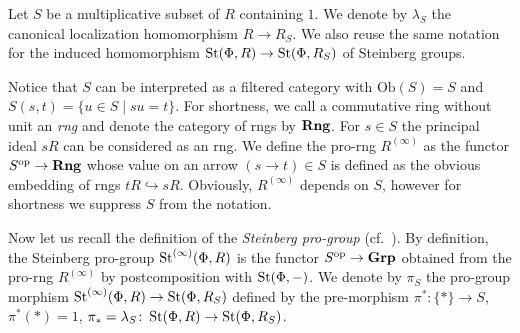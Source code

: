 \documentclass[oneside, 11pt]{amsart} \pdfoutput=1
\begin{document}
Let $S$ be a multiplicative subset of $R$ containing $1$. 
We denote by $\lambda_S$ the canonical localization homomorphism $R \to R_S$.
We also reuse the same notation for the induced homomorphism $\mathop{\mathrm{St}}\nolimits(\Phi, R) \to \mathop{\mathrm{St}}\nolimits(\Phi, R_S)$ of Steinberg groups.

Notice that $S$ can be interpreted as a filtered category with $\mathrm{Ob}(S) = S$ and $S(s, t) = \{ u \in S \mid su = t \}$.
For shortness, we call a commutative ring without unit an {\it rng} and denote the category of rngs by ${\normalfont\textbf{Rng}}$.
For $s\in S$ the principal ideal $sR$ can be considered as an rng. We define the pro-rng $R^{(\infty)}$ as the functor $S^\mathrm{op} \to {\normalfont\textbf{Rng}}$ whose value on an arrow $(s \to t)\in S$ is defined as the obvious embedding of rngs $tR \hookrightarrow sR$. Obviously, $R^{(\infty)}$ depends on $S$, however for shortness we suppress $S$ from the notation.

Now let us recall the definition of the {\it Steinberg pro-group} (cf.~\cite[\S~2.4]{LSV20}). 
By definition, the Steinberg pro-group $\mathop{\mathrm{St}}\nolimits^{(\infty)}(\Phi, R)$ is the functor $S^\mathrm{op} \to {\normalfont\textbf{Grp}}$ obtained from the pro-rng $R^{(\infty)}$ by postcomposition with $\mathop{\mathrm{St}}\nolimits(\Phi, -)$.
We denote by $\pi_S$ the pro-group morphism $\mathop{\mathrm{St}}\nolimits^{(\infty)}(\Phi, R) \to \mathop{\mathrm{St}}\nolimits(\Phi, R_S)$ defined by the pre-morphism $\pi^* \colon \{* \} \to S$, $\pi^*(*) = 1$, $\pi_{*} = \lambda_S \colon \mathop{\mathrm{St}}\nolimits(\Phi, R) \to \mathop{\mathrm{St}}\nolimits(\Phi, R_S)$. 
\end{document}
